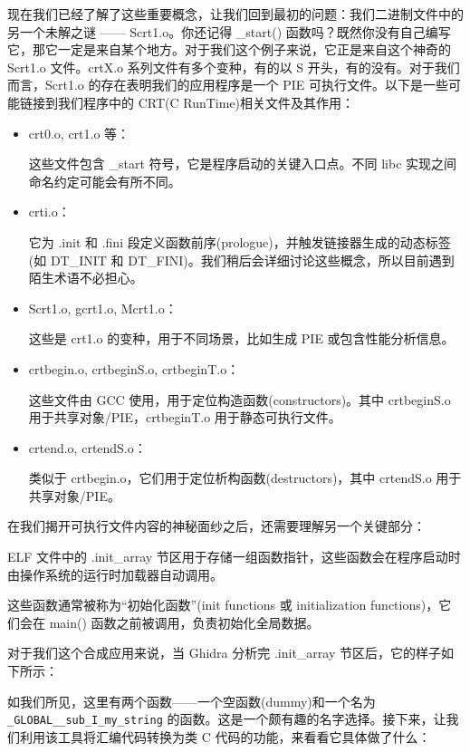 现在我们已经了解了这些重要概念，让我们回到最初的问题：我们二进制文件中的另一个未解之谜 —— Scrt1.o。你还记得 \_start() 函数吗？既然你没有自己编写它，那它一定是来自某个地方。对于我们这个例子来说，它正是来自这个神奇的 Scrt1.o 文件。crtX.o 系列文件有多个变种，有的以 S 开头，有的没有。对于我们而言，Scrt1.o 的存在表明我们的应用程序是一个 PIE 可执行文件。以下是一些可能链接到我们程序中的 CRT(C RunTime)相关文件及其作用：

\begin{itemize}
\item 
crt0.o, crt1.o 等：

这些文件包含 \_start 符号，它是程序启动的关键入口点。不同 libc 实现之间命名约定可能会有所不同。

\item 
crti.o：

它为 .init 和 .fini 段定义函数前序(prologue)，并触发链接器生成的动态标签(如 DT\_INIT 和 DT\_FINI)。我们稍后会详细讨论这些概念，所以目前遇到陌生术语不必担心。

\item 
Scrt1.o, gcrt1.o, Mcrt1.o：

这些是 crt1.o 的变种，用于不同场景，比如生成 PIE 或包含性能分析信息。

\item 
crtbegin.o, crtbeginS.o, crtbeginT.o：

这些文件由 GCC 使用，用于定位构造函数(constructors)。其中 crtbeginS.o 用于共享对象/PIE，crtbeginT.o 用于静态可执行文件。

\item 
crtend.o, crtendS.o：

类似于 crtbegin.o，它们用于定位析构函数(destructors)，其中 crtendS.o 用于共享对象/PIE。
\end{itemize}

在我们揭开可执行文件内容的神秘面纱之后，还需要理解另一个关键部分：

ELF 文件中的 .init\_array 节区用于存储一组函数指针，这些函数会在程序启动时由操作系统的运行时加载器自动调用。

这些函数通常被称为“初始化函数”(init functions 或 initialization functions)，它们会在 main() 函数之前被调用，负责初始化全局数据。

对于我们这个合成应用来说，当 Ghidra 分析完 .init\_array 节区后，它的样子如下所示：


如我们所见，这里有两个函数——一个空函数(dummy)和一个名为 \verb|_GLOBAL__sub_I_my_string| 的函数。这是一个颇有趣的名字选择。接下来，让我们利用该工具将汇编代码转换为类 C 代码的功能，来看看它具体做了什么：

